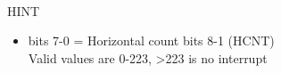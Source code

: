 \\
HINT
\begin{itemize}
\item bits 7-0 = Horizontal count bits 8-1 (HCNT)\\
  Valid values are 0-223, >223 is no interrupt
\end{itemize}


